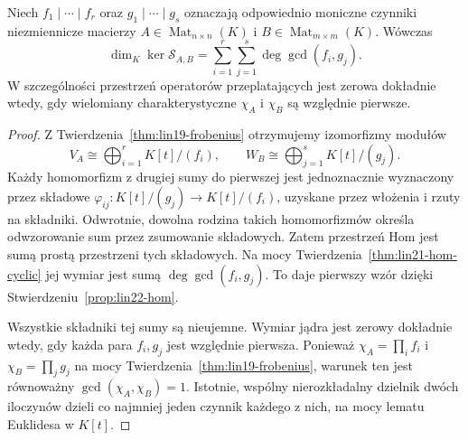 \begin{twierdzenie}
\label{thm:lin22-kernel}
Niech \(f_1\mid\cdots\mid f_r\)
oraz \(g_1\mid\cdots\mid g_s\)
oznaczają odpowiednio moniczne
czynniki niezmiennicze macierzy
\(A\in\operatorname{Mat}_{n\times n}(K)\)
i \(B\in\operatorname{Mat}_{m\times m}(K)\).
Wówczas
\[
 \dim_K\ker\mathcal S_{A,B}
 =\sum_{i=1}^r\sum_{j=1}^s
          \deg\gcd(f_i,g_j).
\]
W szczególności przestrzeń
operatorów przeplatających jest
zerowa dokładnie wtedy, gdy
wielomiany charakterystyczne
\(\chi_A\) i \(\chi_B\)
są względnie pierwsze.
\end{twierdzenie}
\begin{proof}
Z Twierdzenia~\ref{thm:lin19-frobenius}
otrzymujemy izomorfizmy modułów
\[
 V_A\cong\bigoplus_{i=1}^r K[t]/(f_i),
 \qquad
 W_B\cong\bigoplus_{j=1}^s K[t]/(g_j).
\]
Każdy homomorfizm z drugiej
sumy do pierwszej jest jednoznacznie
wyznaczony przez składowe
\(\varphi_{ij}\colon K[t]/(g_j)
\to K[t]/(f_i)\), uzyskane przez
włożenia i rzuty na składniki.
Odwrotnie, dowolna rodzina takich
homomorfizmów określa odwzorowanie
sum przez zsumowanie składowych.
Zatem przestrzeń Hom jest
sumą prostą przestrzeni tych składowych.
Na mocy
Twierdzenia~\ref{thm:lin21-hom-cyclic}
jej wymiar jest sumą
\(\deg\gcd(f_i,g_j)\).
To daje pierwszy wzór dzięki
Stwierdzeniu~\ref{prop:lin22-hom}.

Wszystkie składniki tej sumy
są nieujemne.
Wymiar jądra jest zerowy
dokładnie wtedy, gdy każda para
\(f_i,g_j\) jest względnie pierwsza.
Ponieważ
\(\chi_A=\prod_i f_i\) i
\(\chi_B=\prod_jg_j\)
na mocy
Twierdzenia~\ref{thm:lin19-frobenius},
warunek ten jest równoważny
\(\gcd(\chi_A,\chi_B)=1\).
Istotnie, wspólny nierozkładalny
dzielnik dwóch iloczynów
dzieli co najmniej jeden czynnik
każdego z nich, na mocy
lematu Euklidesa w \(K[t]\).
\end{proof}

